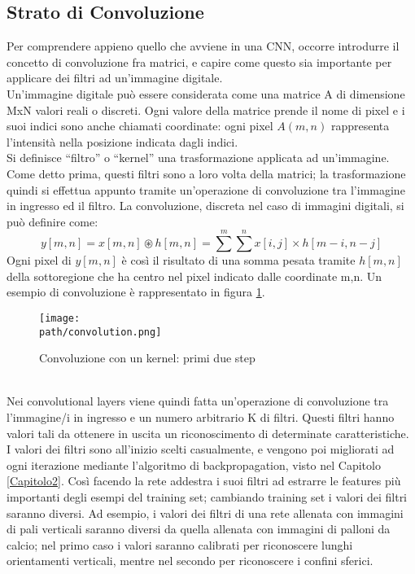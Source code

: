 \subsection{Strato di Convoluzione}
Per comprendere appieno quello che avviene in una CNN, occorre introdurre il concetto di convoluzione fra matrici, e capire come questo sia importante per applicare dei filtri ad un'immagine digitale.
\\
Un’immagine digitale può essere considerata come una matrice A di dimensione MxN valori reali o discreti. Ogni valore della matrice prende il nome di pixel e i suoi indici sono anche chiamati coordinate: ogni pixel $A(m,n)$ rappresenta l’intensità nella posizione indicata dagli indici. \\ 
Si definisce “filtro” o “kernel” una trasformazione applicata ad un’immagine. Come detto prima, questi filtri sono a loro volta della matrici; la trasformazione quindi si effettua appunto tramite un'operazione di convoluzione tra l'immagine in ingresso ed il filtro.
La convoluzione, discreta nel caso di immagini digitali, si può definire come: 
$$
y[m,n] = x[m,n] \circledast h[m,n] = \sum^{m}\sum^{n}x[i,j]\times h[m-i,n-j]
$$
Ogni pixel di $y[m,n]$ è così il risultato di una somma pesata tramite $h[m,n]$ della sottoregione che ha centro nel pixel indicato dalle coordinate m,n. Un esempio di convoluzione è rappresentato in figura \ref{fig:convolution}. 
\begin{figure}[h!]
 \centering
 \texttt{[image: \\path/convolution.png]} 
 \caption{Convoluzione con un kernel: primi due step}
 \label{fig:convolution}
\end{figure}
\\
Nei convolutional layers viene quindi fatta un'operazione di convoluzione tra l'immagine/i in ingresso
e un numero arbitrario K di filtri. Questi filtri hanno valori tali da ottenere in uscita un riconoscimento di determinate caratteristiche. \\
I valori dei filtri sono all'inizio scelti casualmente, e vengono poi migliorati ad ogni iterazione mediante l'algoritmo di backpropagation, visto nel Capitolo \ref{Capitolo2}. Così facendo la rete addestra i suoi filtri ad estrarre le features più importanti degli esempi del training set; cambiando training set i valori dei
filtri saranno diversi.
Ad esempio, i valori dei filtri di una rete allenata con immagini di pali verticali saranno diversi da quella allenata con immagini di palloni da calcio; nel primo caso i valori saranno calibrati per riconoscere lunghi orientamenti verticali, mentre
nel secondo per riconoscere i confini sferici. 

